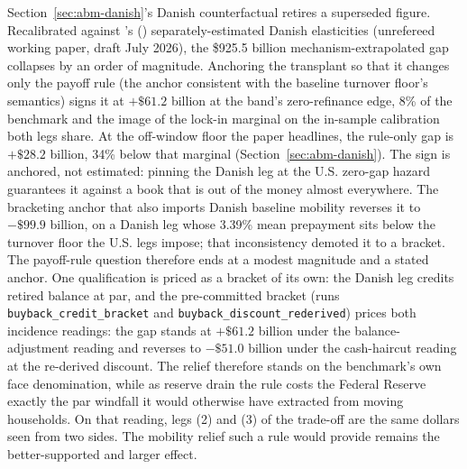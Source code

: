 \documentclass[12pt]{article}
\newcommand{\citepos}[1]{\citeauthor{#1}'s (\citeyear{#1})}
\begin{document}
Section~\ref{sec:abm-danish}'s Danish counterfactual retires a superseded figure. Recalibrated against \citepos{berger2026} separately-estimated Danish elasticities (unrefereed working paper, draft July 2026), the \$925.5 billion mechanism-extrapolated gap collapses by an order of magnitude. Anchoring the transplant so that it changes only the payoff rule (the anchor consistent with the baseline turnover floor's semantics) signs it at $+\$61.2$ billion at the band's zero-refinance edge, 8\% of the benchmark and the image of the lock-in marginal on the in-sample calibration both legs share. At the off-window floor the paper headlines, the rule-only gap is $+\$28.2$ billion, 34\% below that marginal (Section~\ref{sec:abm-danish}). The sign is anchored, not estimated: pinning the Danish leg at the U.S. zero-gap hazard guarantees it against a book that is out of the money almost everywhere. The bracketing anchor that also imports Danish baseline mobility reverses it to $-\$99.9$ billion, on a Danish leg whose 3.39\% mean prepayment sits below the turnover floor the U.S. legs impose; that inconsistency demoted it to a bracket. The payoff-rule question therefore ends at a modest magnitude and a stated anchor. One qualification is priced as a bracket of its own: the Danish leg credits retired balance at par, and the pre-committed bracket (runs \texttt{buyback\_credit\_bracket} and \texttt{buyback\_discount\_rederived}) prices both incidence readings: the gap stands at $+\$61.2$ billion under the balance-adjustment reading and reverses to $-\$51.0$ billion under the cash-haircut reading at the re-derived discount. The relief therefore stands on the benchmark's own face denomination, while as reserve drain the rule costs the Federal Reserve exactly the par windfall it would otherwise have extracted from moving households. On that reading, legs (2) and (3) of the trade-off are the same dollars seen from two sides. The mobility relief such a rule would provide remains the better-supported and larger effect.
\end{document}
